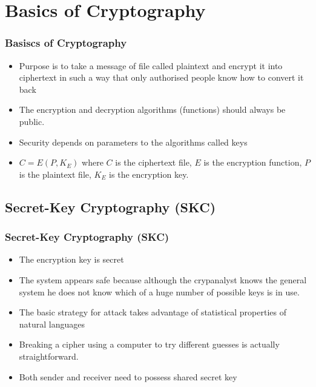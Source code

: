 \documentclass{beamer}
\begin{document}
\section{Basics of Cryptography}
\begin{frame}
\frametitle{Basiscs of Cryptography}
\begin{itemize}
\item Purpose is to take a message of file called plaintext and encrypt it into ciphertext in such a way that only authorised people know how to convert it back
\item The encryption and decryption algorithms (functions) should always be public.
\item Security depends on parameters to the algorithms called keys
\item $C=E(P,K_E)$ where $C$ is the  ciphertext file, $E$ is the encryption function, $P$ is the plaintext file, $K_E$ is the encryption key.
\end{itemize}
\end{frame}
\subsection{Secret-Key Cryptography (SKC)}
\begin{frame}
\frametitle{Secret-Key Cryptography (SKC)}
\begin{itemize}
\item The encryption key is secret
\item The system appears safe because although the crypanalyst knows the general system he does not know which of a huge number of possible keys is in use.
\item The basic strategy for attack takes advantage of statistical properties of natural languages
\item Breaking a cipher using a computer to try different guesses is actually straightforward.
\item Both sender and receiver need to possess shared secret key
\end{itemize}
\end{frame}
\end{document}
